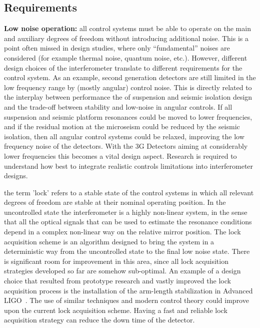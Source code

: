 \subsection{Requirements}
{\bf Low noise operation:} all control systems must be able to operate on the main and auxiliary degrees of freedom without introducing additional noise. This is a point often missed in design studies, where only ``fundamental'' noises are considered (for example thermal noise, quantum noise, etc.). However, different design choices of the interferometer translate to different requirements for the control system. As an example, second generation detectors are still limited in the low frequency range by (mostly angular) control noise. This is directly related to the interplay between performance the of suspension and seismic isolation design and the trade-off between stability and low-noise in angular controls. If all suspension and seismic platform resonances could be moved to lower frequencies, and if the residual motion at the microseism could be reduced by the seismic isolation, then all angular control systems could be relaxed, improving the low frequency noise of the detectors. 
With the 3G Detectors aiming at considerably lower frequencies this becomes a vital design aspect. Research is required to understand how best to integrate realistic controls limitations into interferometer designs.\par
{} the term 'lock' refers to a stable state of the control systems in which all relevant degrees of freedom are stable at their nominal operating position. In the uncontrolled state the interferometer is a highly non-linear system, in the sense that all the optical signals that can be used to estimate the resonance conditions depend in a complex non-linear way on the relative mirror position. The lock acquisition scheme is an algorithm designed to bring the system in a deterministic way from the uncontrolled state to the final low noise state. There is significant room for improvement in this area, since all lock acquisition strategies developed so far are somehow sub-optimal. An example of a design choice that resulted from prototype research and vastly improved the lock acquisition process is the installation of the arm-length stabilization in Advanced LIGO~\cite{Mullavey:12}. The use of similar techniques and modern control theory could improve upon the current lock acquisition scheme. Having a fast and reliable lock acquisition strategy can reduce the down time of the detector.\par
